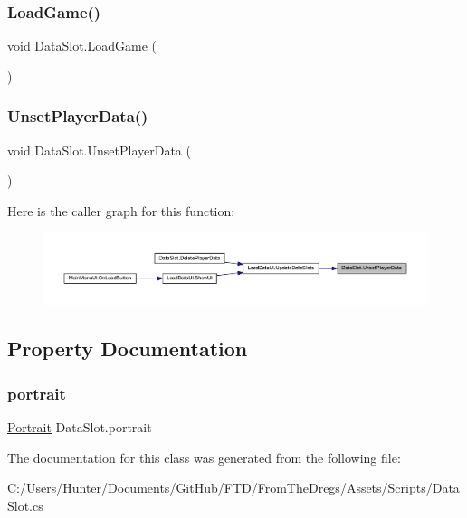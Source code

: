 \subsubsection{\texorpdfstring{LoadGame()}{LoadGame()}}
{\footnotesize\ttfamily void Data\+Slot.\+Load\+Game (\begin{DoxyParamCaption}{ }\end{DoxyParamCaption})}

\mbox{\label{class_data_slot_a2d8c55c9436701f7d2a12ab7388dcdec}} 
\subsubsection{\texorpdfstring{UnsetPlayerData()}{UnsetPlayerData()}}
{\footnotesize\ttfamily void Data\+Slot.\+Unset\+Player\+Data (\begin{DoxyParamCaption}{ }\end{DoxyParamCaption})}

Here is the caller graph for this function\+:
\nopagebreak
\begin{figure}[H]
\begin{center}
\leavevmode
\includegraphics[width=350pt]{class_data_slot_a2d8c55c9436701f7d2a12ab7388dcdec_icgraph}
\end{center}
\end{figure}


\subsection{Property Documentation}
\mbox{\label{class_data_slot_abe2454953aa5b018407db6ebbdc18083}} 
\subsubsection{\texorpdfstring{portrait}{portrait}}
{\footnotesize\ttfamily \mbox{\hyperlink{class_portrait}{Portrait}} Data\+Slot.\+portrait\hspace{0.3cm}{\ttfamily [get]}}



The documentation for this class was generated from the following file\+:\begin{DoxyCompactItemize}
\item 
C\+:/\+Users/\+Hunter/\+Documents/\+Git\+Hub/\+F\+T\+D/\+From\+The\+Dregs/\+Assets/\+Scripts/Data\+Slot.\+cs\end{DoxyCompactItemize}

